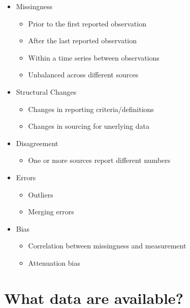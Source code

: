 \documentclass[
]{book}
\providecommand{\tightlist}{%
  \setlength{\itemsep}{0pt}\setlength{\parskip}{0pt}}
\begin{document}
\begin{itemize}
\tightlist
\item
  Missingness

  \begin{itemize}
  \tightlist
  \item
    Prior to the first reported observation
  \item
    After the last reported observation
  \item
    Within a time series between observations
  \item
    Unbalanced across different sources
  \end{itemize}
\item
  Structural Changes

  \begin{itemize}
  \tightlist
  \item
    Changes in reporting criteria/definitions
  \item
    Changes in sourcing for unerlying data
  \end{itemize}
\item
  Disagreement

  \begin{itemize}
  \tightlist
  \item
    One or more sources report different numbers
  \end{itemize}
\item
  Errors

  \begin{itemize}
  \tightlist
  \item
    Outliers
  \item
    Merging errors
  \end{itemize}
\item
  Bias

  \begin{itemize}
  \tightlist
  \item
    Correlation between missingness and measurement
  \item
    Attenuation bias
  \end{itemize}
\end{itemize}

\hypertarget{what-data-are-available}{%
\section{What data are available?}\label{what-data-are-available}}
\end{document}
